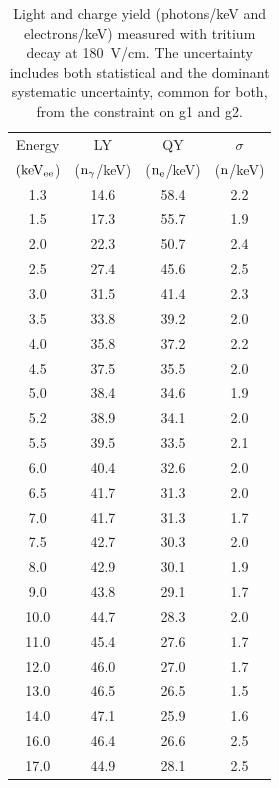 \begin{table}[h!]
\centering
\begin{tabular}{|c|c|c|c|} \hline
Energy 	& 		LY	& 	QY	& $\sigma$ \\ 
$\rm (keV_{ee}$) & ($\rm n_\gamma$/keV)   & ($\rm n_e$/keV) & ($\rm n$/keV) \\ \hline
1.3 	 & 14.6 	 & 58.4 	 & 2.2 	 \\ \hline 
1.5 	 & 17.3 	 & 55.7 	 & 1.9 	 \\ \hline 
2.0 	 & 22.3 	 & 50.7 	 & 2.4 	 \\ \hline 
2.5 	 & 27.4 	 & 45.6 	 & 2.5 	 \\ \hline 
3.0 	 & 31.5 	 & 41.4 	 & 2.3 	 \\ \hline 
3.5 	 & 33.8 	 & 39.2 	 & 2.0 	 \\ \hline 
4.0 	 & 35.8 	 & 37.2 	 & 2.2 	 \\ \hline 
4.5 	 & 37.5 	 & 35.5 	 & 2.0 	 \\ \hline 
5.0 	 & 38.4 	 & 34.6 	 & 1.9 	 \\ \hline 
5.2 	 & 38.9 	 & 34.1 	 & 2.0 	 \\ \hline 
5.5 	 & 39.5 	 & 33.5 	 & 2.1 	 \\ \hline 
6.0 	 & 40.4 	 & 32.6 	 & 2.0 	 \\ \hline 
6.5 	 & 41.7 	 & 31.3 	 & 2.0 	 \\ \hline 
7.0 	 & 41.7 	 & 31.3 	 & 1.7 	 \\ \hline 
7.5 	 & 42.7 	 & 30.3 	 & 2.0 	 \\ \hline 
8.0 	 & 42.9 	 & 30.1 	 & 1.9 	 \\ \hline 
9.0 	 & 43.8 	 & 29.1 	 & 1.7 	 \\ \hline 
10.0 	 & 44.7 	 & 28.3 	 & 2.0 	 \\ \hline 
11.0 	 & 45.4 	 & 27.6 	 & 1.7 	 \\ \hline 
12.0 	 & 46.0 	 & 27.0 	 & 1.7 	 \\ \hline 
13.0 	 & 46.5 	 & 26.5 	 & 1.5 	 \\ \hline 
14.0 	 & 47.1 	 & 25.9 	 & 1.6 	 \\ \hline 
16.0 	 & 46.4 	 & 26.6 	 & 2.5 	 \\ \hline 
17.0 	 & 44.9 	 & 28.1 	 & 2.5 	 \\ \hline 
\end{tabular}
\caption{Light and charge yield (photons/keV and electrons/keV) measured with tritium decay at 180~V/cm. The uncertainty includes both statistical and the dominant systematic uncertainty, common for both, from the constraint on g1 and g2.}
\label{table:Yields}
\end{table}

